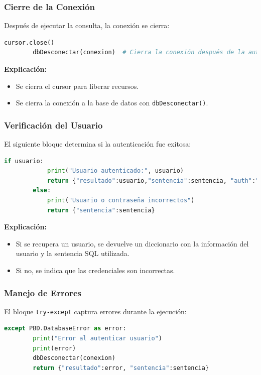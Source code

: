 \documentclass[a4paper,12pt]{article}
\begin{document}
\subsubsection{Cierre de la Conexión}
Después de ejecutar la consulta, la conexión se cierra:

\begin{lstlisting}[language=Python]
        cursor.close()
        dbDesconectar(conexion)  # Cierra la conexión después de la autenticación
\end{lstlisting}

\textbf{Explicación:}
\begin{itemize}
    \item Se cierra el cursor para liberar recursos.
    \item Se cierra la conexión a la base de datos con \texttt{dbDesconectar()}.
\end{itemize}

\subsubsection{Verificación del Usuario}
El siguiente bloque determina si la autenticación fue exitosa:

\begin{lstlisting}[language=Python]
        if usuario:
            print("Usuario autenticado:", usuario)
            return {"resultado":usuario,"sentencia":sentencia, "auth":"true"}
        else:
            print("Usuario o contraseña incorrectos")
            return {"sentencia":sentencia}
\end{lstlisting}

\textbf{Explicación:}
\begin{itemize}
    \item Si se recupera un usuario, se devuelve un diccionario con la información del usuario y la sentencia SQL utilizada.
    \item Si no, se indica que las credenciales son incorrectas.
\end{itemize}

\subsubsection{Manejo de Errores}
El bloque \texttt{try-except} captura errores durante la ejecución:

\begin{lstlisting}[language=Python]
    except PBD.DatabaseError as error:
        print("Error al autenticar usuario")
        print(error)
        dbDesconectar(conexion)
        return {"resultado":error, "sentencia":sentencia}
\end{lstlisting}
\end{document}
